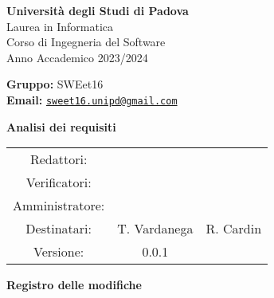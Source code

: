 \documentclass[a4paper, 11pt]{article}
\begin{document}
\begin{minipage}{0.35\linewidth}
   
\end{minipage}\hfil
\begin{minipage}{0.55\linewidth}
\textbf{Università degli Studi di Padova} \\
Laurea in Informatica \\
Corso di Ingegneria del Software \\
Anno Accademico 2023/2024
\end{minipage}

\vspace{5mm}

\begin{minipage}{0.35\linewidth}

\end{minipage}\hfil
\begin{minipage}{0.55\linewidth}
\textbf{Gruppo:} SWEet16 \\
\textbf{Email:} 
\href{mailto:sweet16.unipd@gmail.com}{\nolinkurl{sweet16.unipd@gmail.com}}
\end{minipage}

\vspace{15mm}

\begin{center}
\begin{Huge}
        \textbf{Analisi dei requisiti} \\
        \vspace{4mm}
        
\end{Huge}

\vspace{20mm}

\begin{large}
\begin{spacing}{1.4}
\begin{tabular}{c c c}
   Redattori:  &   & \\
   Verificatori: &  &  \\
   Amministratore: &  & \\
   Destinatari: & T. Vardanega & R. Cardin \\  
   Versione: & 0.0.1 & 
\end{tabular}
\end{spacing}
\end{large}
\end{center}

\pagebreak

\begin{huge}
    \textbf{Registro delle modifiche}
\end{huge}
\vspace{5pt}
\end{document}
